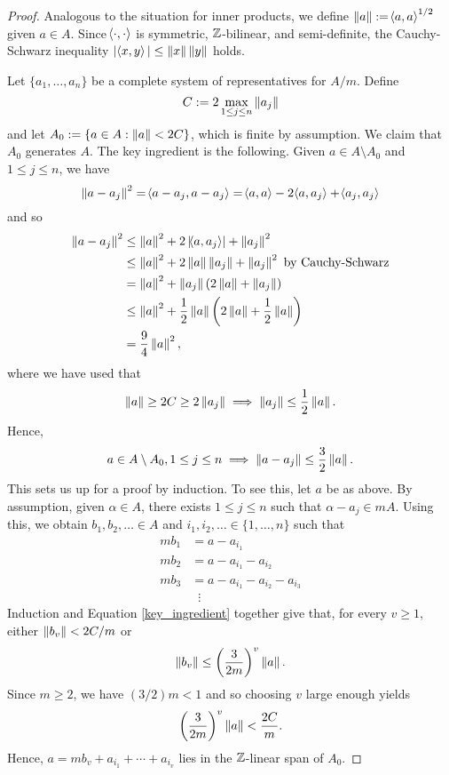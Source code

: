 \documentclass[11pt]{article}
\begin{document}
\begin{proof}
Analogous to the situation for inner products, we define $\left\lVert a\right\rVert:=\!\left\langle a,a\right\rangle^{1/2}$ given $a\in A$. Since $\!\left\langle\cdot,\cdot\right\rangle$ is symmetric, $\mathbb{Z}$-bilinear, and semi-definite, the Cauchy-Schwarz inequality $|\!\left\langle x,y\right\rangle|\leq\left\lVert x\right\rVert\left\lVert y\right\rVert$ holds.

Let $\{a_1,\ldots,a_n\}$ be a complete system of representatives for $A/m$. Define
$$C:=2\max_{1\leq j\leq n}\left\lVert a_j\right\rVert$$ 
and let $A_0:=\{a\in A : \left\lVert a\right\rVert<2C\}$, which is finite by assumption. We claim that $A_0$ generates $A$. The key ingredient is the following. Given $a\in A\setminus A_0$ and $1\leq j\leq n$, we have
$$\left\lVert a-a_j\right\rVert^2=\!\left\langle a-a_j,a-a_j\right\rangle=\!\left\langle a,a\right\rangle-2\!\left\langle a,a_j\right\rangle+\!\left\langle a_j,a_j\right\rangle$$
and so
\begin{align*}
\left\lVert a-a_j\right\rVert^2
&\leq\left\lVert a\right\rVert^2+2\left\lvert\!\left\langle a,a_j\right\rangle\right\rvert+\left\lVert a_j\right\rVert^2 \\
&\leq\left\lVert a\right\rVert^2+2\left\lVert a\right\rVert\left\lVert a_j\right\rVert+\left\lVert a_j\right\rVert^2\textrm{ by Cauchy-Schwarz} \\
&=\left\lVert a\right\rVert^2+\left\lVert a_j\right\rVert(2\left\lVert a\right\rVert+\left\lVert a_j\right\rVert) \\
&\leq\left\lVert a\right\rVert^2+\dfrac{1}{2}\left\lVert a\right\rVert\left(2\left\lVert a\right\rVert+\dfrac{1}{2}\left\lVert a\right\rVert\right) \\
&=\dfrac{9}{4}\left\lVert a\right\rVert^2,
\end{align*}
where we have used that 
$$\left\lVert a\right\rVert\geq2C\geq2\left\lVert a_j\right\rVert\implies\left\lVert a_j\right\rVert\leq\dfrac{1}{2}\left\lVert a\right\rVert.$$
Hence,
\begin{equation}\label{key_ingredient}
a\in A\setminus A_0,1\leq j\leq n\implies\left\lVert a-a_j\right\rVert\leq\dfrac{3}{2}\left\lVert a\right\rVert.
\end{equation}
This sets us up for a proof by induction. To see this, let $a$ be as above. By assumption, given $\alpha\in A$, there exists $1\leq j\leq n$ such that $\alpha-a_j\in mA$. Using this, we obtain $b_1,b_2,\ldots\in A$ and $i_1,i_2,\ldots\in\{1,\ldots,n\}$ such that
\begin{align*}
mb_1&=a-a_{i_1} \\
mb_2&=a-a_{i_1}-a_{i_2} \\
mb_3&=a-a_{i_1}-a_{i_2}-a_{i_3} \\
&\;\;\vdots
\end{align*}
Induction and Equation \eqref{key_ingredient} together give that, for every $v\geq1$, either $\left\lVert b_v\right\rVert<2C/m$ or 
$$\left\lVert b_v\right\rVert\leq\left(\dfrac{3}{2m}\right)^v\left\lVert a\right\rVert.$$
Since $m\geq2$, we have $(3/2)m<1$ and so choosing $v$ large enough yields 
$$\left(\dfrac{3}{2m}\right)^v\left\lVert a\right\rVert<\dfrac{2C}{m}.$$
Hence, $a=mb_v+a_{i_1}+\cdots+a_{i_v}$ lies in the $\mathbb{Z}$-linear span of $A_0$.
\end{proof}
\end{document}
